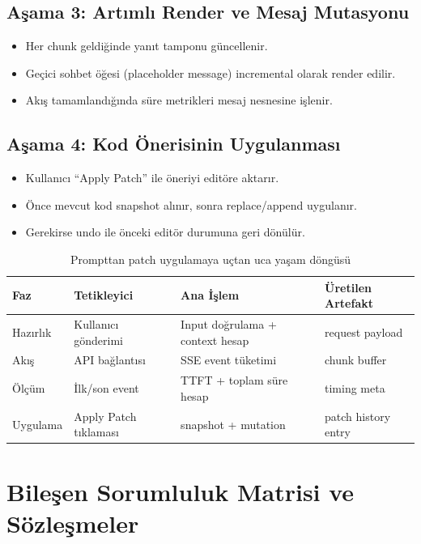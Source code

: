 \documentclass[12pt,a4paper]{article}
\begin{document}
\subsection{Aşama 3: Artımlı Render ve Mesaj Mutasyonu}
\begin{itemize}[leftmargin=*]
  \item Her chunk geldiğinde yanıt tamponu güncellenir.
  \item Geçici sohbet öğesi (placeholder message) incremental olarak render edilir.
  \item Akış tamamlandığında süre metrikleri mesaj nesnesine işlenir.
\end{itemize}

\subsection{Aşama 4: Kod Önerisinin Uygulanması}
\begin{itemize}[leftmargin=*]
  \item Kullanıcı ``Apply Patch'' ile öneriyi editöre aktarır.
  \item Önce mevcut kod snapshot alınır, sonra replace/append uygulanır.
  \item Gerekirse undo ile önceki editör durumuna geri dönülür.
\end{itemize}

\begin{table}[h!]
  \centering\small
  \begin{tabular}{@{} P{2.4cm} P{3.0cm} P{3.8cm} P{3.0cm} @{}}
    \toprule
    Faz & Tetikleyici & Ana İşlem & Üretilen Artefakt \\
    \midrule
    Hazırlık & Kullanıcı gönderimi & Input doğrulama + context hesap & request payload \\
    Akış & API bağlantısı & SSE event tüketimi & chunk buffer \\
    Ölçüm & İlk/son event & TTFT + toplam süre hesap & timing meta \\
    Uygulama & Apply Patch tıklaması & snapshot + mutation & patch history entry \\
    \bottomrule
  \end{tabular}
  \caption{Prompttan patch uygulamaya uçtan uca yaşam döngüsü}
\end{table}

\section{Bileşen Sorumluluk Matrisi ve Sözleşmeler}
\end{document}
